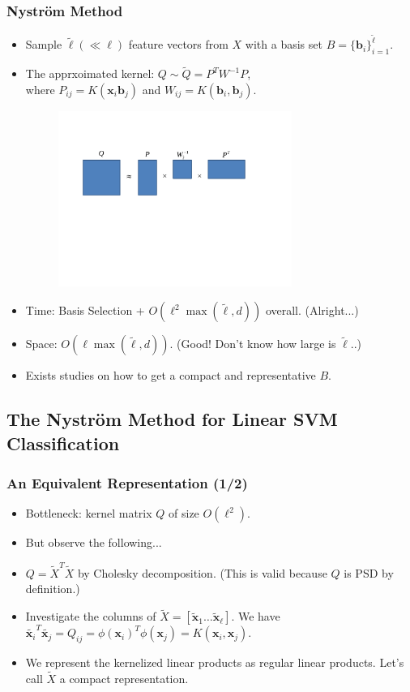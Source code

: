 \documentclass{beamer}
\def\bb{{\boldsymbol b}}
\def\bb{{\boldsymbol b}}
\def\bx{{\boldsymbol x}}
\def\x{{\mathbf x}}
\begin{document}
\begin{frame}
  \frametitle{Nystr\"om Method}
  \begin{itemize}
    \item Sample $\tilde{\ell} (\ll \ell)$ feature vectors from $X$ with a basis set $B = \{\bb_i\}_{i = 1}^{\tilde{\ell}}$.
    \item The apprxoimated kernel: $Q \sim \tilde{Q} = P^TW^{-1}P$, \\
    where $P_{ij} = K(\bx_i \bb_j)$ and $W_{ij} = K(\bb_i, \bb_j)$.
\begin{figure}
  \includegraphics[width=3in]{nystrom.pdf}\\
\end{figure}


    \pause
    \item Time: Basis Selection + $O(\ell^2 \max(\tilde{\ell}, d))$ overall. (Alright...)
    \item [] Space: $O(\ell \max(\tilde{\ell}, d))$. (Good! Don't know how large is $\tilde{\ell}$..)
    \pause
    \item Exists studies on how to get a compact and representative $B$.
  \end{itemize}
\end{frame}

\subsection{The Nystr\"om Method for Linear SVM Classification}
\begin{frame}
  \frametitle{An Equivalent Representation (1/2)}
  \begin{itemize}
    \item Bottleneck: kernel matrix $Q$ of size $O(\ell^2)$.
    \item [] But observe the following...
    \pause
    \item $Q = \tilde{X}^T\tilde{X}$ by Cholesky decomposition. (This is valid because $Q$ is PSD by definition.)
    \item Investigate the columns of $\tilde{X} = [\tilde{\bx}_1 \dots \tilde{\bx}_\ell]$. We have 
    $
    \tilde{\bx_i}^T \tilde{\bx_j} = 
    Q_{ij} = 
    \phi(\bx_i)^T \phi(\x_j) = K(\bx_i,\bx_j) 
    $.
    \pause
    \item We represent the kernelized linear products as regular linear products. Let's call $\tilde{X}$ a compact representation. 
  \end{itemize}
\end{frame}
\end{document}
